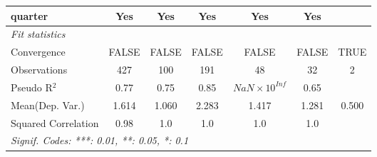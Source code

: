 \begin{tabular}{lcccccc}
   quarter                                                    & Yes           & Yes           & Yes        & Yes                   & Yes     & \\  
   \midrule
   \emph{Fit statistics}\\
   Convergence                                                &FALSE          & FALSE         & FALSE      & FALSE                 & FALSE   & TRUE\\  
   Observations                                               & 427           & 100           & 191        & 48                    & 32      & 2\\  
   Pseudo R$^2$                                               & 0.77          & 0.75          & 0.85       & $NaN\times 10^{Inf}$  & 0.65    & \\  
Mean(Dep. Var.) & 1.614 & 1.060 & 2.283 & 1.417 & 1.281 & 0.500 \\
   Squared Correlation                                        & 0.98          & 1.0           & 1.0        & 1.0                   & 1.0     & \\  
   \midrule \midrule
   \multicolumn{7}{l}{\emph{Signif. Codes: ***: 0.01, **: 0.05, *: 0.1}}\\
\end{tabular}
\par\endgroup
